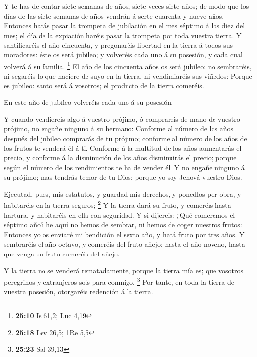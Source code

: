  Y te has de contar siete semanas de años, siete veces
siete años; de modo que los días de las siete semanas de años vendrán á
serte cuarenta y nueve años.  Entonces harás pasar la
trompeta de jubilación en el mes séptimo á los diez del mes; el día de
la expiación haréis pasar la trompeta por toda vuestra tierra.
 Y santificaréis el año cincuenta, y pregonaréis libertad
en la tierra á todos sus moradores: éste os será jubileo; y volveréis
cada uno á su posesión, y cada cual volverá á su familia. \footnote{\textbf{25:10}
  Is 61,2; Luc 4,19}  El año de los cincuenta años os
será jubileo: no sembraréis, ni segaréis lo que naciere de suyo en la
tierra, ni vendimiaréis sus viñedos:  Porque es jubileo:
santo será á vosotros; el producto de la tierra comeréis.

 En este año de jubileo volveréis cada uno á su posesión.

 Y cuando vendiereis algo á vuestro prójimo, ó comprareis
de mano de vuestro prójimo, no engañe ninguno á su hermano:
 Conforme al número de los años después del jubileo
comprarás de tu prójimo; conforme al número de los años de los frutos te
venderá él á ti.  Conforme á la multitud de los años
aumentarás el precio, y conforme á la disminución de los años
disminuirás el precio; porque según el número de los rendimientos te ha
de vender él.  Y no engañe ninguno á su prójimo; mas
tendrás temor de tu Dios: porque yo soy Jehová vuestro Dios.

 Ejecutad, pues, mis estatutos, y guardad mis derechos, y
ponedlos por obra, y habitaréis en la tierra seguros; \footnote{\textbf{25:18}
  Lev 26,5; 1Re 5,5}  Y la tierra dará su fruto, y
comeréis hasta hartura, y habitaréis en ella con seguridad.
 Y si dijereis: ¿Qué comeremos el séptimo año? he aquí no
hemos de sembrar, ni hemos de coger nuestros frutos: 
Entonces yo os enviaré mi bendición el sexto año, y hará fruto por tres
años.  Y sembraréis el año octavo, y comeréis del fruto
añejo; hasta el año noveno, hasta que venga su fruto comeréis del añejo.

 Y la tierra no se venderá rematadamente, porque la
tierra mía es; que vosotros peregrinos y extranjeros sois para conmigo.
\footnote{\textbf{25:23} Sal 39,13}  Por tanto, en toda
la tierra de vuestra posesión, otorgaréis redención á la tierra.

